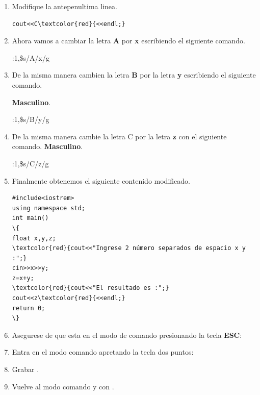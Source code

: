 \documentclass[a4paper,12pt,spanish]{article}
\begin{document}
\begin{enumerate}
\begin{Verbatim}[commandchars=\\\{\}]
\textcolor{red}{cout<<"Ingrese 2 numero separados de espacia A B :";}
\end{Verbatim}

\item Modifique la antepenultima linea.

\begin{Verbatim}[commandchars=\\\{\}]
cout<<C\textcolor{red}{<<endl;}
\end{Verbatim}


  

\item Ahora vamos a cambiar la letra  \textbf{A}  por \textbf{x} escribiendo el siguiente
comando.
    \begin{tcolorbox}[colback=gray!5]
   {\Large :1,\$s/A/x/g}
  \end{tcolorbox}

 
\item De la misma manera cambien la letra \textbf{B}  por la letra \textbf{y} escribiendo el siguiente comando.
  
\textbf{Masculino}.
    \begin{tcolorbox}[colback=gray!5]
   {\Large :1,\$s/B/y/g}
  \end{tcolorbox}


\item De la misma manera cambie la  letra \textsf{C} por la letra \textbf{z} con el siguiente comando.
\textbf{Masculino}.
    \begin{tcolorbox}[colback=gray!5]
   {\Large :1,\$s/C/z/g}
  \end{tcolorbox}

\item Finalmente obtenemos el siguiente contenido modificado.
  
\begin{Verbatim}[commandchars=\\\{\}]
#include<iostrem>
using namespace std;
int main()
\{
float x,y,z;
\textcolor{red}{cout<<"Ingrese 2 número separados de espacio x y :";}
cin>>x>>y;
z=x+y;
\textcolor{red}{cout<<"El resultado es :";}
cout<<z\textcolor{red}{<<endl;}
return 0;
\}
\end{Verbatim}
\item Asegurese de que esta en el modo de comando presionando la tecla \textbf{ESC}:
\item Entra en el modo comando apretando la tecla dos puntos:
\item Grabar .
\item Vuelve al modo comando y con \fbox{\Large :} .


\end{enumerate}
\end{document}
